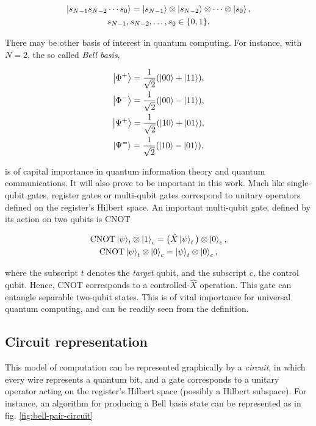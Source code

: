     \begin{gather}
      \ket{s_{N-1}s_{N-2} \cdots s_0} = \ket{s_{N-1}} \otimes \ket{s_{N-2}}\otimes \cdots \otimes \ket{s_{0}}, \\
      s_{N-1}, s_{N-2}, \ldots, s_0 \in \{0,1\}.
      \label{eq:multi-qubit-basis}
    \end{gather}

    There may be other basis of interest in quantum computing. For instance, with $N=2$, the so called \textit{Bell basis},

    \begin{gather}
      \ket{\Phi^{+}} = \frac{1}{\sqrt{2}}(\ket{00} + \ket{11}),\\
      \ket{\Phi^{-}} = \frac{1}{\sqrt{2}}(\ket{00} - \ket{11}),\\
      \ket{\Psi^{+}} = \frac{1}{\sqrt{2}}(\ket{10} + \ket{01}),\\
      \ket{\Psi^{=}} = \frac{1}{\sqrt{2}}(\ket{10} - \ket{01}),
      \label{eq:BellBasis}
    \end{gather}

    \noindent is of capital importance in quantum information theory and quantum communications. It will also prove to be important in this work. Much like single-qubit gates, register gates or multi-qubit gates correspond to unitary operators defined on the register's Hilbert space. An important multi-qubit gate, defined by its action on two qubits is CNOT

    \begin{gather}
      \text{CNOT}\ket{\psi}_t \otimes \ket{1}_c = \big(\hat{X}\ket{\psi}_t\big) \otimes \ket{0}_c, \\
      \text{CNOT}\ket{\psi}_t \otimes \ket{0}_c = \ket{\psi}_t \otimes \ket{0}_c,
      \label{eq:cnot-gate}
    \end{gather}

    \noindent where the subscript $t$ denotes the \textit{target} qubit, and the subscript $c$, the control qubit. Hence, CNOT corresponds to a controlled-$\hat{X}$ operation. This gate can entangle separable two-qubit states. This is of vital importance for universal quantum computing, and can be readily seen from the definition.

  \subsection{Circuit representation}
  \label{subsec:CiruitGraphics}

    This model of computation can be represented graphically by a \textit{circuit}, in which every wire represents a quantum bit, and a gate corresponds to a unitary operator acting on the register's Hilbert space (possibly a Hilbert subspace). For instance, an algorithm for producing a Bell basis state can be represented as in fig. \ref{fig:bell-pair-circuit}

